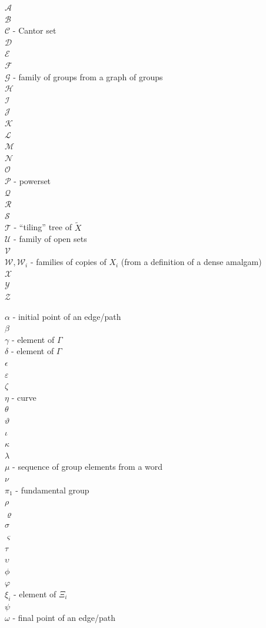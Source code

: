 \documentclass[12pt, a4paper]{article}
\newcommand{\8}{\infty}
\theoremstyle{break}
\theoremstyle{defbreak}
\newcommand{\wtl}[1]{\widetilde{#1}}
\begin{document}
{$\mathcal{A}$\\
$\mathcal{B}$\\
$\mathcal{C}$ - Cantor set\\
$\mathcal{D}$\\
$\mathcal{E}$\\
$\mathcal{F}$\\
$\mathcal{G}$ - family of groups from a graph of groups\\
$\mathcal{H}$\\
$\mathcal{I}$\\
$\mathcal{J}$\\
$\mathcal{K}$\\
$\mathcal{L}$\\
$\mathcal{M}$\\
$\mathcal{N}$\\
$\mathcal{O}$\\
$\mathcal{P}$ - powerset\\
$\mathcal{Q}$\\
$\mathcal{R}$\\
$\mathcal{S}$\\
$\mathcal{T}$ - ``tiling'' tree of $\wtl{X}$\\
$\mathcal{U}$ - family of open sets\\
$\mathcal{V}$\\
$\mathcal{W}, \mathcal{W}_i$ - families of copies of $X_i$ (from a definition of a dense amalgam)\\
$\mathcal{X}$\\
$\mathcal{Y}$\\
$\mathcal{Z}$

$\alpha$ - initial point of an edge/path\\
$\beta$\\
$\gamma$ - element of $\Gamma$\\
$\delta$ - element of $\Gamma$\\
$\epsilon$\\
$\varepsilon$\\
$\zeta$\\
$\eta$ - curve\\
$\theta$\\
$\vartheta$\\
$\iota$\\
$\kappa$\\
$\lambda$\\
$\mu$ - sequence of group elements from a word\\
$\nu$\\
$\pi_1$ - fundamental group\\
$\rho$\\
$\varrho$\\
$\sigma$\\
$\varsigma$\\
$\tau$\\
$\upsilon$\\
$\phi$\\
$\varphi$\\
$\xi_i$ - element of $\Xi_i$\\
$\psi$\\
$\omega$ - final point of an edge/path 

}
\end{document}

